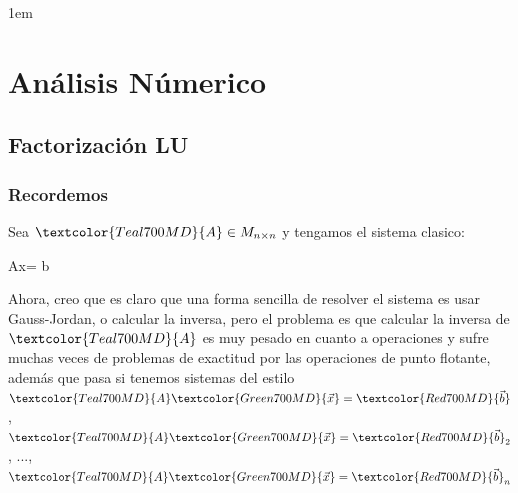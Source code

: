 \documentclass[12pt, fleqn]{report}                             %
\newenvironment{SmallIndentation}[1][0.75em]                    %
        {\begin{adjustwidth}{#1}{}\begin{footnotesize}}             %
        {\end{footnotesize}\end{adjustwidth}}                       %
\def \Eq {equation}                                             %
\newenvironment{MultiLineEquation*}[1]                          %
        {\begin{\Eq*}\begin{alignedat}{#1}}                         %
        {\end{alignedat}\end{\Eq*}}                                 %
\newenvironment{largeEq} {\begingroup \large}{\endgroup}        %
\theoremstyle{break}                                            %
\newcommand{\Color}[2]{\textcolor{#1}{#2}}                      %
\newcommand \ColorMatrixA       {Teal700MD}                     %
\newcommand \ColorVecX          {Green700MD}                    %
\newcommand \ColorVecB          {Red700MD}                      %
\newcommand \MatrixA      {\Color{\ColorMatrixA}{A}}            %
\newcommand \VecX         {\Color{\ColorVecX}{\vec x}}          %
\newcommand \VecB         {\Color{\ColorVecB}{\vec b}}          %
\begin{document}
\begin{itemize}
\begin{SmallIndentation}[1em]
\begin{itemize}
                            \end{itemize}
                        
                        \end{SmallIndentation}

                \end{itemize}

                       
                    

                    

\part{Análisis Númerico}

    \chapter{Factorización LU}

        \clearpage
        \section{Recordemos}

            Sea $\MatrixA \in M_{n \times n}$ y tengamos el sistema
            clasico:
            \begin{largeEq}
                \begin{MultiLineEquation*}{3}
                    \MatrixA \VecX = \VecB
                \end{MultiLineEquation*}
            \end{largeEq}

            Ahora, creo que es claro que una forma sencilla de resolver el sistema es usar Gauss-Jordan, o calcular
            la inversa,
            pero el problema es que calcular la inversa de $\MatrixA$ es muy pesado en cuanto a operaciones
            y sufre muchas veces de problemas de exactitud por las operaciones de punto flotante, además que pasa
            si tenemos sistemas del estilo $\MatrixA \VecX = \VecB$, $\MatrixA \VecX = \VecB_2$, ..., $\MatrixA \VecX = \VecB_n$
                
\end{document}
